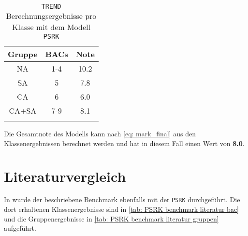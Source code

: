 \documentclass[../thesis.tex]{subfiles}
\begin{document}
\begin{table} [htb]
	\centering
	\caption{\texttt{TREND} Berechnungsergebnisse pro Klasse mit dem Modell \texttt{PSRK}}
	\begin{tabular}{ ccc }
		\hline
		Gruppe & BACs & Note  \\
		\hline
		NA & 1-4 & 10.2 \\
		SA & 5   & 7.8 \\
		CA & 6   & 6.0 \\
		CA+SA & 7-9 & 8.1 \\ 
	
		\hline
		\label{tab: meine_gesamt_ergebnisse}
	\end{tabular}
\end{table}

Die Gesamtnote des Modells kann nach \autoref{eq: mark_final} aus den Klassenergebnissen berechnet werden und hat in diesem Fall einen Wert von \textbf{8.0}.

\section{Literaturvergleich}

In \cite{moine2021} wurde der beschriebene Benchmark ebenfalls mit der \texttt{PSRK} durchgeführt. Die dort erhaltenen Klassenergebnisse sind in \autoref{tab: PSRK benchmark literatur bac} und die Gruppenergebnisse in \autoref{tab: PSRK benchmark literatur gruppen} aufgeführt.
\end{document}
